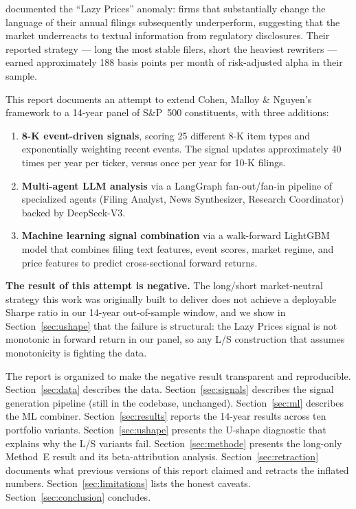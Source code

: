 \documentclass[11pt,a4paper]{article}
\begin{document}
\citet{cohen2020lazy} documented the ``Lazy Prices'' anomaly: firms that substantially change the language of their annual filings subsequently underperform, suggesting that the market underreacts to textual information from regulatory disclosures. Their reported strategy --- long the most stable filers, short the heaviest rewriters --- earned approximately 188 basis points per month of risk-adjusted alpha in their sample.

This report documents an attempt to extend Cohen, Malloy \& Nguyen's framework to a 14-year panel of S\&P~500 constituents, with three additions:
\begin{enumerate}[noitemsep]
    \item \textbf{8-K event-driven signals}, scoring 25 different 8-K item types and exponentially weighting recent events. The signal updates approximately 40 times per year per ticker, versus once per year for 10-K filings.
    \item \textbf{Multi-agent LLM analysis} via a LangGraph fan-out/fan-in pipeline of specialized agents (Filing Analyst, News Synthesizer, Research Coordinator) backed by DeepSeek-V3.
    \item \textbf{Machine learning signal combination} via a walk-forward LightGBM model that combines filing text features, event scores, market regime, and price features to predict cross-sectional forward returns.
\end{enumerate}

\textbf{The result of this attempt is negative.} The long/short market-neutral strategy this work was originally built to deliver does not achieve a deployable Sharpe ratio in our 14-year out-of-sample window, and we show in Section~\ref{sec:ushape} that the failure is structural: the Lazy Prices signal is not monotonic in forward return in our panel, so any L/S construction that assumes monotonicity is fighting the data.

The report is organized to make the negative result transparent and reproducible. Section~\ref{sec:data} describes the data. Section~\ref{sec:signals} describes the signal generation pipeline (still in the codebase, unchanged). Section~\ref{sec:ml} describes the ML combiner. Section~\ref{sec:results} reports the 14-year results across ten portfolio variants. Section~\ref{sec:ushape} presents the U-shape diagnostic that explains why the L/S variants fail. Section~\ref{sec:methode} presents the long-only Method~E result and its beta-attribution analysis. Section~\ref{sec:retraction} documents what previous versions of this report claimed and retracts the inflated numbers. Section~\ref{sec:limitations} lists the honest caveats. Section~\ref{sec:conclusion} concludes.
\end{document}
